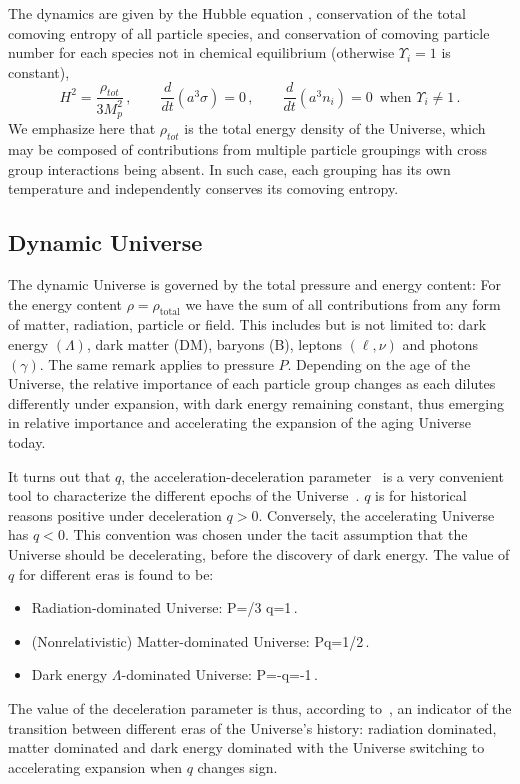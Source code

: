 The dynamics are given by the Hubble equation , conservation of the total comoving entropy of all particle species, and conservation of comoving particle number for each species not in chemical equilibrium (otherwise $\Upsilon_i=1$ is constant),
\begin{equation}\label{eq:dynamics}
H^2=\frac{\rho_{tot}}{3M_p^2}\,, \qquad \frac{d}{dt}(a^3\sigma )=0\,,\qquad \frac{d}{dt}(a^3n_i)=0 \,\text{ when } \Upsilon_i\neq 1\,.
\end{equation}
We emphasize here that $\rho_{tot}$ is the total energy density of the Universe, which may be composed of contributions from multiple particle groupings with cross group interactions being absent. In such case, each grouping has its own temperature and independently conserves its comoving entropy. 
%

\subsection{Dynamic Universe}\label{sec:dynamic}
The dynamic Universe is governed by the total pressure and energy content: For the energy content $\rho=\rho_\mathrm{total}$ we have the sum of all contributions from any form of matter, radiation, particle or field. This includes but is not limited to: dark energy $(\Lambda)$, dark matter (DM), baryons (B), leptons $(\ell,\nu)$ and photons $(\gamma)$. The same remark applies to pressure $P$. Depending on the age of the Universe, the relative importance of each particle group changes as each dilutes differently under expansion, with dark energy remaining constant, thus emerging in relative importance and accelerating the expansion of the aging Universe today. 

It turns out that $q$, the acceleration-deceleration parameter~ is a very convenient tool to characterize the different epochs of the Universe~\cite{Rafelski:2013yka}. $q$ is for historical reasons positive under deceleration $q>0$. Conversely, the accelerating Universe has $q<0$. This convention was chosen under the tacit assumption that the Universe should be decelerating, before the discovery of dark energy. The value of $q$ for different eras is found to be:
\begin{itemize}
\item Radiation-dominated Universe: 
P=\rho/3 \implies q=1\,.
\eeqn
\item (Nonrelativistic) Matter-dominated Universe: 
P\ll\rho \implies q=1/2\,.
\eeqn
\item Dark energy $\Lambda$-dominated Universe: 
P=-\rho \implies q=-1\,.
\eeqn
\end{itemize}
The value of the deceleration parameter is thus, according to~, an indicator of the transition between different eras of the Universe's history: radiation dominated, matter dominated and dark energy dominated with the Universe switching to accelerating expansion when $q$ changes sign.

